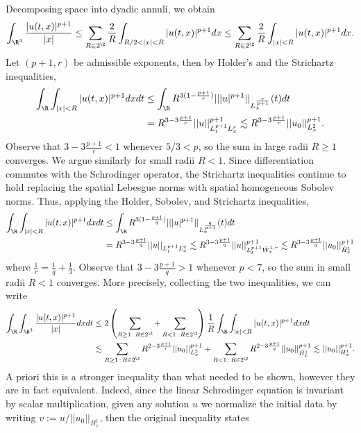 \begin{solution}
	Decomposing space into dyadic annuli, we obtain
		\[ \int_{\R^3} \frac{|u(t, x)|^{p + 1}}{|x|} \leq \sum_{R \in 2^\Z} \frac2R \int_{R/2 < |x| < R} |u(t, x)|^{p + 1} dx \leq \sum_{R \in 2^\Z} \frac2R \int_{|x| < R} |u(t, x)|^{p + 1} dx.\]
	Let $(p + 1, r)$ be admissible exponents, then by Holder's and the Strichartz inequalities, 
		\begin{align*}
			 \int_\R \int_{|x| < R} |u(t, x)|^{p + 1} dx dt 
			 	&\leq  \int_\R R^{3(1 - \frac{p + 1}{r})} || |u|^{p + 1} ||_{L^{\frac{r}{p + 1}}_x} (t) dt \\
			 	&= R^{3 - 3\frac{p + 1}{r}}  || u||_{L^{p + 1}_t L^r_x}^{p + 1}  \lesssim R^{3 - 3\frac{p + 1}{r}}  ||u_0||_{L^2_x}^{p + 1}.
		\end{align*}	 
	Observe that $3 - 3\frac{p + 1}{r} < 1$ whenever $5/3 < p$, so the sum in large radii $R \geq 1$ converges. We argue similarly for small radii $R < 1$. Since differentiation commutes with the Schrodinger operator, the Strichartz inequalities continue to hold replacing the spatial Lebesgue norms with spatial homogeneous Sobolev norms. Thus, applying the Holder, Sobolev, and Strichartz inequalities, 
		\begin{align*}
			 \int_\R \int_{|x| < R} |u(t, x)|^{p + 1} dx dt 
			 	&\leq \int_\R R^{3 (1 - \frac{p + 1}{q})} || |u|^{p + 1}||_{L^{\frac{q}{p + 1}}_x} (t) dt \\
			 	&= R^{3 - 3 \frac{p + 1}{q}} || u ||_{L^{p + 1}_t L^q_x} \lesssim R^{3 - 3 \frac{p + 1}{q}} ||u||_{L^{p + 1}_t \dot W^{1, r}_x}^{p + 1} \lesssim R^{3 - 3 \frac{p + 1}{q}} ||u_0||_{\dot H^1_x}^{p + 1}
		\end{align*}
	where $\tfrac1r = \tfrac1q + \tfrac13$. Observe that $3 - 3 \frac{p + 1}{q} > 1$ whenever $p < 7$, so the sum in small radii $R < 1$ converges. More precisely, collecting the two inequalities, we can write
		\begin{align*}
			 \int_\R \int_{\R^3} \frac{|u(t, x)|^{p + 1}}{|x|} dx dt 
			 	&\leq 2 \left(\sum_{R \geq 1 \, : \, R \in 2^\Z} + \sum_{R < 1 \, : \, R \in 2^\Z}  \right) \frac1R \int_\R \int_{|x| < R} |u(t, x)|^{p + 1} dx dt \\
			 	&\lesssim \sum_{R \geq 1 \, : \, R \in 2^\Z} R^{2 - 3\frac{p + 1}{r}}  ||u_0||_{L^2_x}^{p + 1} + \sum_{R < 1 \, : \, R \in 2^\Z}  R^{2 - 3 \frac{p + 1}{q}} ||u_0||_{\dot H^1_x}^{p + 1} \lesssim ||u_0||_{H^1_x}^{p + 1}.
		\end{align*}	 
	A priori this is a stronger inequality than what needed to be shown, however they are in fact equivalent. Indeed, since the linear Schrodinger equation is invariant by scalar multiplication, given any solution $u$ we normalize the initial data by writing $v := u/||u_0||_{H^1_x}$, then the original inequality states

\end{solution}
